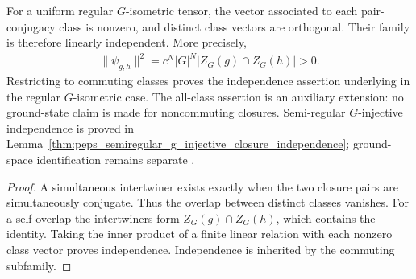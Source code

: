 \begin{lemma}%
    \label{thm:peps_regular_torus_closure_independence}
    \leanok
    For a uniform regular $G$-isometric tensor, the vector associated
    to each pair-conjugacy class is nonzero, and distinct class vectors
    are orthogonal. Their family is therefore linearly independent.
    More precisely,
    \begin{align}
        \|\psi_{g,h}\|^2=c^N|G|^N|Z_G(g)\cap Z_G(h)|>0.
    \end{align}
    Restricting to commuting classes proves the independence assertion
    underlying \cite[Theorem~5.9]{Schuch2010PEPS} in the regular
    $G$-isometric case. The all-class assertion is an auxiliary extension:
    no ground-state claim is made for noncommuting closures. Semi-regular
    $G$-injective independence is proved in
    Lemma~\ref{thm:peps_semiregular_g_injective_closure_independence};
    ground-space identification remains separate
    \cite{gap:rmp_peps_quantum_double_g_isometry}.
\end{lemma}

\begin{proof}\leanok
    A simultaneous intertwiner exists exactly when the two closure pairs
    are simultaneously conjugate. Thus the overlap between distinct
    classes vanishes. For a self-overlap the intertwiners form
    $Z_G(g)\cap Z_G(h)$, which contains the identity. Taking the inner
    product of a finite linear relation with each nonzero class vector
    proves independence. Independence is inherited by the commuting
    subfamily.
\end{proof}

